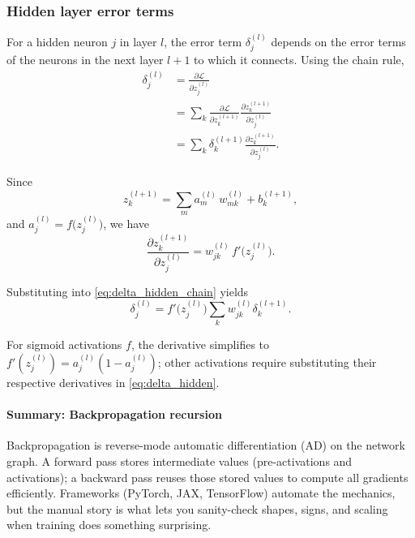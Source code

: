\subsubsection{Hidden layer error terms}
\label{sec:backprop_hidden_layer_error_terms_sub}

For a hidden neuron \( j \) in layer \( l \), the error term \(\delta_j^{(l)}\) depends on the error terms of the neurons in the next layer \( l+1 \) to which it connects. Using the chain rule,
\begin{equation}
\begin{aligned}
\delta_j^{(l)} &= \frac{\partial \mathcal{L}}{\partial z_j^{(l)}} \\
&= \sum_{k} \frac{\partial \mathcal{L}}{\partial z_k^{(l+1)}} \frac{\partial z_k^{(l+1)}}{\partial z_j^{(l)}} \\
&= \sum_{k} \delta_k^{(l+1)} \frac{\partial z_k^{(l+1)}}{\partial z_j^{(l)}}.
\end{aligned}
\label{eq:delta_hidden_chain}
\end{equation}

Since
\[
z_k^{(l+1)} = \sum_m a_m^{(l)}\, w_{mk}^{(l)} + b_k^{(l+1)},
\]
and \( a_j^{(l)} = f\big(z_j^{(l)}\big) \), we have
\[
\frac{\partial z_k^{(l+1)}}{\partial z_j^{(l)}} = w_{jk}^{(l)} \, f'\big(z_j^{(l)}\big).
\]

Substituting into \eqref{eq:delta_hidden_chain} yields
\begin{equation}
\delta_j^{(l)} = f'\big(z_j^{(l)}\big) \sum_{k} w_{jk}^{(l)} \delta_k^{(l+1)}.
\label{eq:delta_hidden}
\end{equation}

For sigmoid activations \(f\), the derivative simplifies to \(f'(z_j^{(l)}) = a_j^{(l)} (1 - a_j^{(l)})\); other activations require substituting their respective derivatives in \eqref{eq:delta_hidden}.

\paragraph{Summary: Backpropagation recursion}
Backpropagation is reverse\hyp{}mode automatic differentiation (AD) on the network graph. A forward pass stores intermediate values (pre\hyp{}activations and activations); a backward pass reuses those stored values to compute all gradients efficiently. Frameworks (PyTorch, JAX, TensorFlow) automate the mechanics, but the manual story is what lets you sanity-check shapes, signs, and scaling when training does something surprising.

